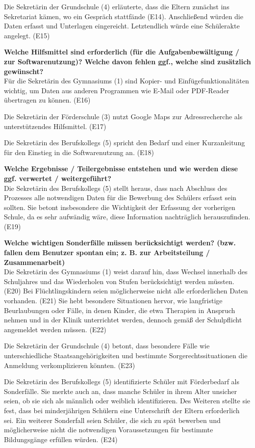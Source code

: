 Die Sekretärin der Grundschule (4) erläuterte, dass die Eltern zunächst ins Sekretariat kämen, wo ein Gespräch stattfände (E14). Anschließend würden die Daten erfasst und Unterlagen eingereicht. Letztendlich würde eine Schülerakte angelegt. (E15)

\textbf{Welche Hilfsmittel sind erforderlich (für die Aufgabenbewältigung / zur Softwarenutzung)? Welche davon fehlen ggf., welche sind zusätzlich gewünscht?}\\
Für die Sekretärin des Gymnasiums (1) sind Kopier- und Einfügefunktionalitäten wichtig, um Daten aus anderen Programmen wie E-Mail oder PDF-Reader übertragen zu können. (E16)

Die Sekretärin der Förderschule (3) nutzt Google Maps zur Adressrecherche als unterstützendes Hilfsmittel. (E17)

Die Sekretärin des Berufskollegs (5) spricht den Bedarf und einer Kurzanleitung für den Einstieg in die Softwarenutzung an. (E18)

\textbf{Welche Ergebnisse / Teilergebnisse entstehen und wie werden diese ggf. verwertet / weitergeführt?}\\
Die Sekretärin des Berufskollegs (5) stellt heraus, dass nach Abschluss des Prozesses alle notwendigen Daten für die Bewerbung des Schülers erfasst sein sollten. Sie betont insbesondere die Wichtigkeit der Erfassung der vorherigen Schule, da es sehr aufwändig wäre, diese Information nachträglich herauszufinden.(E19) 

\textbf{Welche wichtigen Sonderfälle müssen berücksichtigt werden? (bzw. fallen dem Benutzer spontan ein; z. B. zur Arbeitsteilung / Zusammenarbeit)}\\
Die Sekretärin des Gymnasiums (1) weist darauf hin, dass Wechsel innerhalb des Schuljahres und das Wiederholen von Stufen berücksichtigt werden müssten. (E20) Bei Flüchtlingskindern seien möglicherweise nicht alle erforderlichen Daten vorhanden. (E21) Sie hebt besondere Situationen hervor, wie langfristige Beurlaubungen oder Fälle, in denen Kinder, die etwa Therapien in Anspruch nehmen und in der Klinik unterrichtet werden, dennoch gemäß der Schulpflicht angemeldet werden müssen. (E22)

Die Sekretärin der Grundschule (4) betont, dass besondere Fälle wie unterschiedliche Staatsangehörigkeiten und bestimmte Sorgerechtssituationen die Anmeldung verkomplizieren könnten. (E23)

Die Sekretärin des Berufskollegs (5) identifizierte Schüler mit Förderbedarf als Sonderfälle. Sie merkte auch an, dass manche Schüler in ihrem Alter unsicher seien, ob sie sich als männlich oder weiblich identifizieren. Des Weiteren stellte sie fest, dass bei minderjährigen Schülern eine Unterschrift der Eltern erforderlich sei. Ein weiterer Sonderfall seien Schüler, die sich zu spät bewerben und möglicherweise nicht die notwendigen Voraussetzungen für bestimmte Bildungsgänge erfüllen würden. (E24)


